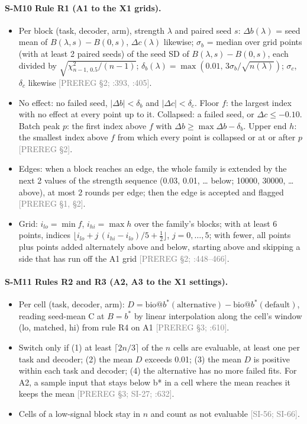 \documentclass[11pt]{article}
\newcommand{\src}[1]{{\scriptsize\textcolor{gray}{[#1]}}}
\begin{document}
\paragraph{S-M10 Rule R1 (A1 to the X1 grids).}
\begin{itemize}
\item Per block (task, decoder, arm), strength $\lambda$ and paired seed $s$: $\Delta b(\lambda)$ = seed mean of $B(\lambda, s) - B(0, s)$, $\Delta c(\lambda)$ likewise; $\sigma_b$ = median over grid points (with at least 2 paired seeds) of the seed SD of $B(\lambda, s) - B(0, s)$, each divided by $\sqrt{\chi^2_{n-1,\,0.5}/(n-1)}$; $\delta_b(\lambda) = \max(0.01,\, 3\sigma_b/\sqrt{n(\lambda)})$; $\sigma_c$, $\delta_c$ likewise \src{PREREG \S2; :393, :405}.
\item No effect: no failed seed, $|\Delta b| < \delta_b$ and $|\Delta c| < \delta_c$. Floor $f$: the largest index with no effect at every point up to it. Collapsed: a failed seed, or $\Delta c \leq -0.10$. Batch peak $p$: the first index above $f$ with $\Delta b \geq \max\Delta b - \delta_b$. Upper end $h$: the smallest index above $f$ from which every point is collapsed or at or after $p$ \src{PREREG \S2}.
\item Edges: when a block reaches an edge, the whole family is extended by the next 2 values of the strength sequence (0.03, 0.01, \ldots{} below; 10000, 30000, \ldots{} above), at most 2 rounds per edge; then the edge is accepted and flagged \src{PREREG \S1, \S2}.
\item Grid: $i_{lo} = \min f$, $i_{hi} = \max h$ over the family's blocks; with at least 6 points, indices $\lfloor i_{lo} + j\,(i_{hi} - i_{lo})/5 + \frac{1}{2} \rfloor$, $j = 0, \ldots, 5$; with fewer, all points plus points added alternately above and below, starting above and skipping a side that has run off the A1 grid \src{PREREG \S2; :448--466}.
\end{itemize}
\paragraph{S-M11 Rules R2 and R3 (A2, A3 to the X1 settings).}
\begin{itemize}
\item Per cell (task, decoder, arm): $D = \mathrm{bio@}b^*(\text{alternative}) - \mathrm{bio@}b^*(\text{default})$, reading seed-mean C at $B = b^*$ by linear interpolation along the cell's window (lo, matched, hi) from rule R4 on A1 \src{PREREG \S3; :610}.
\item Switch only if (1) at least $\lceil 2n/3 \rceil$ of the $n$ cells are evaluable, at least one per task and decoder; (2) the mean $D$ exceeds 0.01; (3) the mean $D$ is positive within each task and decoder; (4) the alternative has no more failed fits. For A2, a sample input that stays below b* in a cell where the mean reaches it keeps the mean \src{PREREG \S3; SI-27; :632}.
\item Cells of a low-signal block stay in $n$ and count as not evaluable \src{SI-56; SI-66}.
\end{itemize}
\end{document}
